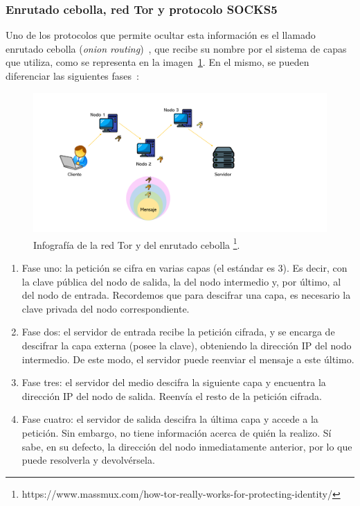 \subsubsection{Enrutado cebolla, red Tor y protocolo SOCKS5}

Uno de los protocolos que permite ocultar esta información es el llamado enrutado cebolla (\textit{onion routing})~\cite{TorAvast2022}, que recibe su nombre por el sistema de capas que utiliza, como se representa en la imagen~\ref{img:red_tor}. En el mismo, se pueden diferenciar las siguientes fases~\cite{TorKeepCoding2022}: 

\begin{figure}[h]
	\caption[Enrutado cebolla.]{Infografía de la red Tor y del enrutado cebolla \footnote{https://www.massmux.com/how-tor-really-works-for-protecting-identity/}. }
	\label{img:red_tor}
	\centering
	\includegraphics[scale=0.35]{../img/memoria/3_onion_routing}
\end{figure}

\begin{enumerate}
	\item Fase uno: la petición se cifra en varias capas (el estándar es 3). Es decir, con la clave pública del nodo de salida, la del nodo intermedio y, por último, al del nodo de entrada. Recordemos que para descifrar una capa, es necesario la clave privada del nodo correspondiente.
	\item Fase dos: el servidor de entrada recibe la petición cifrada, y se encarga de descifrar la capa externa (posee la clave), obteniendo la dirección IP del nodo intermedio. De este modo, el servidor puede reenviar el mensaje a este último.
	\item Fase tres: el servidor del medio descifra la siguiente capa y encuentra la dirección IP del nodo de salida. Reenvía el resto de la petición cifrada.
	\item Fase cuatro: el servidor de salida descifra la última capa y accede a la petición. Sin embargo, no tiene información acerca de quién la realizo. Sí sabe, en su defecto, la dirección del nodo inmediatamente anterior, por lo que puede resolverla y devolvérsela.
\end{enumerate}


